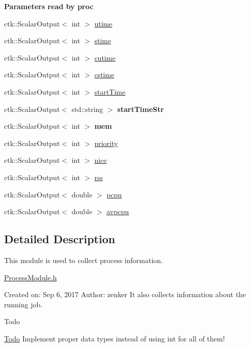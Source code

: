 \begin{Indent}{\bf Parameters read by proc}\par
\begin{DoxyCompactItemize}
\item 
ctk\+::\+Scalar\+Output$<$ int $>$ \hyperlink{structProcessInfoModule_acb97a86ba87cf1ac2d347b63a5f8fdfa}{utime}
\item 
ctk\+::\+Scalar\+Output$<$ int $>$ \hyperlink{structProcessInfoModule_ac56fdecfc319beb99b6664a258d1bc4d}{stime}
\item 
ctk\+::\+Scalar\+Output$<$ int $>$ \hyperlink{structProcessInfoModule_acc12e39ff6f0005bf2bdb37213ddc3db}{cutime}
\item 
ctk\+::\+Scalar\+Output$<$ int $>$ \hyperlink{structProcessInfoModule_ae0a6f1fc5d6e4f96f027fc8133753cf6}{cstime}
\item 
ctk\+::\+Scalar\+Output$<$ int $>$ \hyperlink{structProcessInfoModule_aa52bd4fa074f2eae67418bf7f5eec591}{start\+Time}
\item 
ctk\+::\+Scalar\+Output$<$ std\+::string $>$ {\bfseries start\+Time\+Str}
\item 
ctk\+::\+Scalar\+Output$<$ int $>$ {\bfseries mem}
\item 
ctk\+::\+Scalar\+Output$<$ int $>$ \hyperlink{structProcessInfoModule_a7e3b2a386b71e32fc493055292339c85}{priority}
\item 
ctk\+::\+Scalar\+Output$<$ int $>$ \hyperlink{structProcessInfoModule_a8ba8efe92809d50ac68d49c0a9cf16e0}{nice}
\item 
ctk\+::\+Scalar\+Output$<$ int $>$ \hyperlink{structProcessInfoModule_aeabc4e2387c4facc7097dafb5a745bd4}{rss}
\item 
ctk\+::\+Scalar\+Output$<$ double $>$ \hyperlink{structProcessInfoModule_a0523ecd5aaa8518050f2b23000ab6705}{pcpu}
\item 
ctk\+::\+Scalar\+Output$<$ double $>$ \hyperlink{structProcessInfoModule_a835b59215e858942a3e26cefd122d350}{avpcpu}
\end{DoxyCompactItemize}
\end{Indent}


\subsection{Detailed Description}
This module is used to collect process information. 

\hyperlink{ProcessModule_8h_source}{Process\+Module.\+h}

Created on\+: Sep 6, 2017 Author\+: zenker It also collects information about the running job. \begin{DoxyRefDesc}{Todo}
\item[\hyperlink{todo__todo000001}{Todo}]Implement proper data types instead of using int for all of them! \end{DoxyRefDesc}



